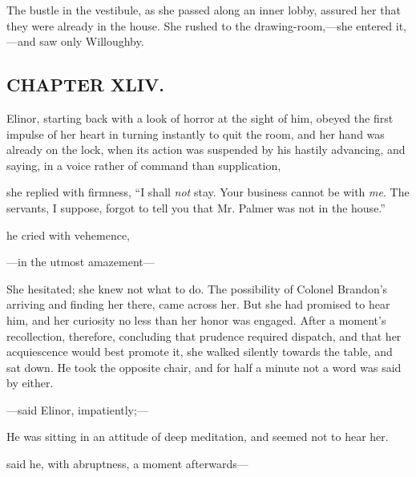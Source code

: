 The bustle in the vestibule, as she passed along an inner lobby, assured her that they were already in the house. She rushed to the drawing-room,---she entered it,---and saw only Willoughby.

\subsection[chapter-xliv.]{\useURL[url44][][][]\from[url44]CHAPTER XLIV.}

Elinor, starting back with a look of horror at the sight of him, obeyed the first impulse of her heart in turning instantly to quit the room, and her hand was already on the lock, when its action was suspended by his hastily advancing, and saying, in a voice rather of command than supplication,


 she replied with firmness, “I shall {\em not} stay. Your business cannot be with {\em me}. The servants, I suppose, forgot to tell you that Mr. Palmer was not in the house.”

 he cried with vehemence, 

---in the utmost amazement---


She hesitated; she knew not what to do. The possibility of Colonel Brandon's arriving and finding her there, came across her. But she had promised to hear him, and her curiosity no less than her honor was engaged. After a moment's recollection, therefore, concluding that prudence required dispatch, and that her acquiescence would best promote it, she walked silently towards the table, and sat down. He took the opposite chair, and for half a minute not a word was said by either.

---said Elinor, impatiently;---

He was sitting in an attitude of deep meditation, and seemed not to hear her.

 said he, with abruptness, a moment afterwards---

